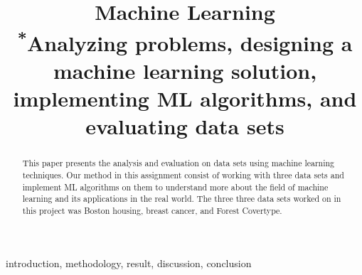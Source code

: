 \documentclass[conference]{IEEEtran}
\begin{document}
\title{Machine Learning\\
{\footnotesize \textsuperscript{*}Analyzing problems, designing a machine learning solution, implementing ML algorithms, and evaluating  data sets }
}

\author{
\and
{}
\and
{}
\and
{}
}

\maketitle


\begin{abstract}
This paper presents the analysis and evaluation on data sets using machine learning techniques. Our method in this assignment consist of working with three data sets and implement ML algorithms on them to understand more about the field of machine learning and its applications in the real world. The three three data sets worked on in this project was  Boston housing, breast cancer, and Forest Covertype.
\end{abstract}

\begin{IEEEkeywords}
introduction, methodology, result, discussion, conclusion
\end{IEEEkeywords}
\end{document}
